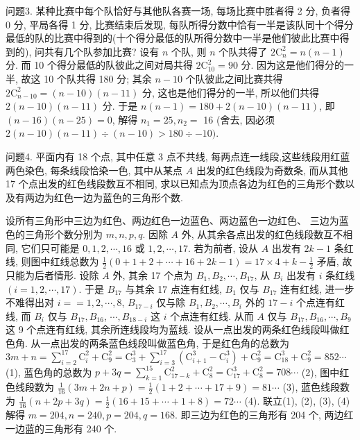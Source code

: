 问题3. 某种比赛中每个队恰好与其他队各赛一场, 每场比赛中胜者得 2 分, 负者得 0 分, 平局各得 1 分, 比赛结束后发现, 每队所得分数中恰有一半是该队同十个得分最低的队的比赛中得到的(十个得分最低的队所得分数中一半是他们彼此比赛中得到的), 问共有几个队参加比赛?
设有 $n$ 个队, 则 $n$ 个队共得了 $2 \mathrm{C}_n^2=n(n-1)$ 分.
而 10 个得分最低的队彼此之间对局共得 $2 \mathrm{C}_{10}^2=90$ 分.
因为这是他们得分的一半, 故这 10 个队共得 180 分; 其余 $n-10$ 个队彼此之间比赛共得 $2 \mathrm{C}_{n-10}^2=(n-10)(n-11)$ 分, 这也是他们得分的一半, 所以他们共得 $2(n-10)(n-11)$ 分.
于是 $n(n- 1)=180+2(n-10)(n-11)$, 即 $(n-16)(n-25)=0$, 解得 $n_1=25, n_2=$ 16 (舍去, 因必须 $2(n-10)(n-11) \div(n-10)>180 \div-10)$.



问题4. 平面内有 18 个点, 其中任意 3 点不共线, 每两点连一线段,这些线段用红蓝两色染色, 每条线段恰染一色, 其中从某点 $A$ 出发的红色线段为奇数条, 而从其他 17 个点出发的红色线段数互不相同, 求以已知点为顶点各边为红色的三角形个数以及有两边为红色一边为蓝色的三角形个数.
 
设所有三角形中三边为红色、两边红色一边蓝色、两边蓝色一边红色、 三边为蓝色的三角形个数分别为 $m, n, p, q$. 因除 $A$ 外, 从其余各点出发的红色线段数互不相同, 它们只可能是 $0,1,2, \cdots, 16$ 或 $1,2, \cdots, 17$. 
若为前者, 设从 $A$ 出发有 $2 k-1$ 条红线, 则图中红线总数为 $\frac{1}{2}(0+1+2+\cdots+16+ 2 k-1)=17 \times 4+k-\frac{1}{2}$ 矛盾, 故只能为后者情形.
设除 $A$ 外, 其余 17 个点为 $B_1, B_2, \cdots, B_{17}$, 从 $B_i$ 出发有 $i$ 条红线 $(i=1,2, \cdots, 17)$. 
于是 $B_{17}$ 与其余 17 点连有红线, $B_1$ 仅与 $B_{17}$ 连有红线, 进一步不难得出对 $i==1,2, \cdots, 8$, $B_{17-i}$ 仅与除 $B_1, B_2, \cdots, B_i$ 外的 $17-i$ 个点连有红线, 而 $B_i$ 仅与 $B_{17}, B_{16}$, $\cdots, B_{18-i}$ 这 $i$ 个点连有红线.
从而 $A$ 仅与 $B_{17}, B_{16}, \cdots, B_9$ 这 9 个点连有红线, 其余所连线段均为蓝线.
设从一点出发的两条红色线段叫做红色角.
从一点出发的两条蓝色线段叫做蓝色角, 于是红色角的总数为 $3 m+n=\sum_{i=2}^{17} \mathrm{C}_i^2+ \mathrm{C}_9^2=\mathrm{C}_3^3+\sum_{i=3}^{17}\left(\mathrm{C}_{i+1}^3-\mathrm{C}_i^3\right)+\mathrm{C}_9^2=\mathrm{C}_{18}^3+\mathrm{C}_9^2=852 \cdots$ (1), 
蓝色角的总数为 $p+ 3 q=\sum_{k=1}^{15} \mathrm{C}_{17-k}^2+\mathrm{C}_8^2=\mathrm{C}_{17}^3+\mathrm{C}_8^2=708 \cdots$ (2), 
图中红色线段数为 $\frac{1}{16}(3 m+2 n+ p)=\frac{1}{2}(1+2+\cdots+17+9)=81 \cdots$ (3), 
蓝色线段数为 $\frac{1}{16}(n+2 p+3 q)= \frac{1}{2}(16+15+\cdots+1+8)=72 \cdots$ (4). 
联立(1), (2), (3), (4)解得 $m=204, n= 240, p=204, q=168$. 即三边为红色的三角形有 204 个, 两边红一边蓝的三角形有 240 个.



